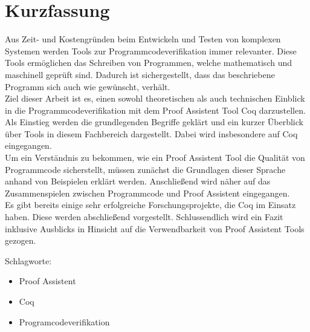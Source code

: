 \section*{Kurzfassung}
\thispagestyle{empty}


Aus Zeit- und Kostengründen beim Entwickeln und Testen von komplexen Systemen werden Tools zur Programmcodeverifikation immer relevanter.
Diese Tools ermöglichen das Schreiben von Programmen, welche mathematisch und maschinell geprüft sind. Dadurch ist sichergestellt, dass das beschriebene Programm sich auch wie gewünscht, verhält.\\
Ziel dieser Arbeit ist es, einen sowohl theoretischen als auch technischen Einblick in die Programmcodeverifikation mit dem Proof Assistent Tool Coq darzustellen.
Als Einstieg werden die grundlegenden Begriffe geklärt und ein kurzer Überblick über Tools in diesem Fachbereich dargestellt. Dabei wird insbesondere auf Coq eingegangen.\\
Um ein Verständnis zu bekommen, wie ein Proof Assistent Tool die Qualität von Programmcode sicherstellt, müssen zunächst die Grundlagen dieser Sprache anhand von Beispielen erklärt werden. Anschließend wird näher auf das Zusammenspielen zwischen Programmcode und Proof Assistent eingegangen.\\
Es gibt bereits einige sehr erfolgreiche Forschungsprojekte, die Coq im Einsatz haben. Diese werden abschließend vorgestellt. Schlussendlich wird ein Fazit inklusive Ausblicks in Hinsicht auf die Verwendbarkeit von Proof Assistent Tools gezogen.
\bigskip

\noindent
Schlagworte:
\begin{itemize}
	\item Proof Assistent
	\item Coq
	\item Programcodeverifikation
\end{itemize}


